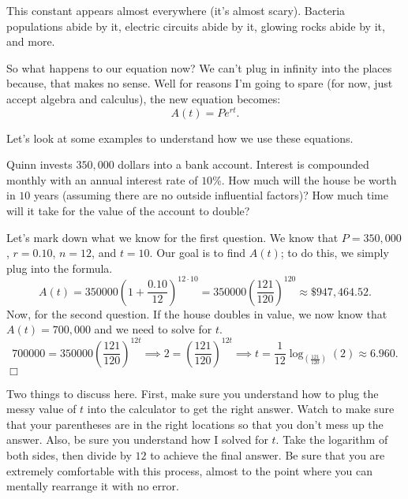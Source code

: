 \documentclass[lang=en,11pt]{elegantbook}
\begin{document}
This constant appears almost everywhere (it's almost scary).  Bacteria populations abide by it, electric circuits abide by it, glowing rocks abide by it, and more.

So what happens to our equation now?  We can’t plug in infinity into the places because, that makes no sense. Well for reasons I’m going to spare (for now, just accept algebra and calculus), the new equation becomes: $$A(t)=Pe^{rt}.$$

Let's look at some examples to understand how we use these equations.
\begin{example}
Quinn invests $350,000$ dollars into a bank account. Interest is compounded monthly with an annual interest rate of $10$\%. How much will the house be worth in $10$ years (assuming there are no outside influential factors)?  How much time will it take for the value of the account to double?
\end{example}
\begin{solution}
Let's mark down what we know for the first question.  We know that $P=350,000$, $r=0.10$, $n=12$, and $t=10$.  Our goal is to find $A(t)$; to do this, we simply plug into the formula.
$$A(t)=350000\left(1+\dfrac{0.10}{12}\right)^{12\cdot 10}=350000\left(\dfrac{121}{120}\right)^{120}\approx \$947,464.52.$$  Now, for the second question.  If the house doubles in value, we now know that $A(t)=700,000$ and we need to solve for $t$.  $$700000=350000\left(\dfrac{121}{120}\right)^{12t} \implies 2=\left(\dfrac{121}{120}\right)^{12t}\implies t=\dfrac{1}{12}\log_{\left(\frac{121}{120}\right)}(2) \approx 6.960.$$ $\Box$
\end{solution}
\begin{remark}
Two things to discuss here.  First, make sure you understand how to plug the messy value of $t$ into the calculator to get the right answer.  Watch to make sure that your parentheses are in the right locations so that you don't mess up the answer.  Also, be sure you understand how I solved for $t$.  Take the logarithm of both sides, then divide by $12$ to achieve the final answer.  Be sure that you are extremely comfortable with this process, almost to the point where you can mentally rearrange it with no error.
\end{remark}
\end{document}
